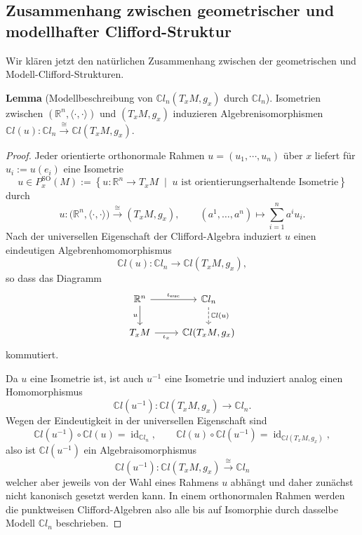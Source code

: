 \documentclass[10pt, letterpaper]{article}
\newcommand{\SKP}{\langle\cdot,\cdot\rangle}
\newcommand{\id}{\operatorname{id}}
\newcommand{\R}{\mathbb{R}}
\newcommand{\C}{\mathbb{C}}
\newcommand{\SO}{\mathrm{SO}}
\newcommand{\CustomHeading}[3]{%
  \par\medskip\noindent%
  \textbf{#1 #2} \textnormal{(#3)}.\enskip%
}
\newenvironment{LEM}[2]{\CustomHeading{Lemma}{#1}{#2}}{}
\begin{document}
\subsection{Zusammenhang zwischen geometrischer und modellhafter Clifford-Struktur}


Wir klären jetzt den natürlichen Zusammenhang zwischen der geometrischen und Modell-Clifford-Strukturen.

\begin{LEM}{}{Modellbeschreibung von $\C l_n(T_xM,g_x)$ durch $\C l_n$} Isometrien zwischen $(\R^n,\SKP)$ und $(T_xM,g_x)$ induzieren Algebrenisomorphismen $\C l(u): \C l_n \overset{\cong}{\to} \C l(T_xM,g_x)$.
\end{LEM}


\begin{proof}
    
Jeder orientierte orthonormale Rahmen $u=(u_1,\cdots,u_n)$ über $x$ liefert für $u_i:=u(e_i)$ eine Isometrie 
$$u\in P_x^{\SO}(M):=\left\{u:\R^n\to T_xM\;\middle|\;u \text{ ist orientierungserhaltende Isometrie}\right\}$$ 
durch
\[
u:\bigl(\R^n,\SKP\bigr)\xrightarrow{\;\cong\;}(T_xM,g_x),
\qquad
(a^1,\dots,a^n)\longmapsto \sum_{i=1}^n a^i u_i.
\]
Nach der universellen Eigenschaft der Clifford-Algebra induziert \(u\) einen
eindeutigen Algebrenhomomorphismus
\[
\C l(u):\C l_n\longrightarrow \C l(T_xM,g_x),
\]
so dass das Diagramm
\[
\begin{tikzcd}
\R^n \arrow[r, "\iota_{\mathrm{euc}}"] \arrow[d, "u"'] 
& \C l_n \arrow[d, dashed, "\C l(u)"] \\
T_xM \arrow[r, "\iota_x"'] 
& \C l(T_xM,g_x)
\end{tikzcd}
\]
kommutiert.

Da \(u\) eine Isometrie ist, ist auch \(u^{-1}\) eine Isometrie und induziert
analog einen Homomorphismus
\[
\C l(u^{-1}):\C l(T_xM,g_x)\to \C l_n.
\]
Wegen der Eindeutigkeit in der universellen Eigenschaft sind
\[
\C l(u^{-1})\circ \C l(u)=\id_{\C l_n},
\qquad
\C l(u)\circ \C l(u^{-1})=\id_{\C l(T_xM,g_x)},
\]
also ist \(\C l(u^{-1})\) ein Algebraisomorphismus
$$\C l(u^{-1}): \C l(T_xM,g_x)\overset{\cong}{\to} \C l_n$$
welcher aber jeweils von der Wahl eines Rahmens $u$ abhängt und daher zunächst nicht kanonisch gesetzt werden kann. In einem orthonormalen Rahmen werden die punktweisen Clifford-Algebren also alle bis auf Isomorphie durch dasselbe Modell \(\C l_n\) beschrieben. 

\end{proof}


\bigskip
\end{document}
